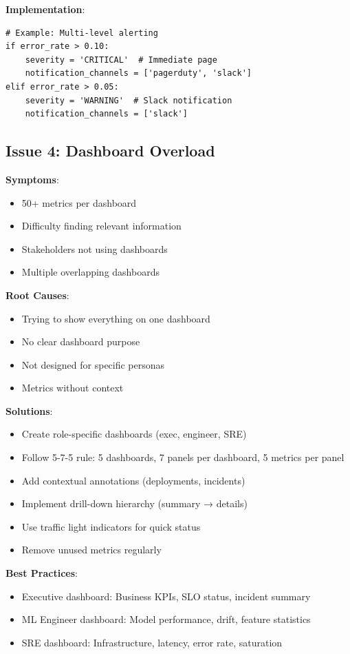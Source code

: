 \textbf{Implementation}:
\begin{lstlisting}[style=python]
# Example: Multi-level alerting
if error_rate > 0.10:
    severity = 'CRITICAL'  # Immediate page
    notification_channels = ['pagerduty', 'slack']
elif error_rate > 0.05:
    severity = 'WARNING'  # Slack notification
    notification_channels = ['slack']
\end{lstlisting}

\subsection{Issue 4: Dashboard Overload}

\textbf{Symptoms}:
\begin{itemize}
    \item 50+ metrics per dashboard
    \item Difficulty finding relevant information
    \item Stakeholders not using dashboards
    \item Multiple overlapping dashboards
\end{itemize}

\textbf{Root Causes}:
\begin{itemize}
    \item Trying to show everything on one dashboard
    \item No clear dashboard purpose
    \item Not designed for specific personas
    \item Metrics without context
\end{itemize}

\textbf{Solutions}:
\begin{itemize}
    \item Create role-specific dashboards (exec, engineer, SRE)
    \item Follow 5-7-5 rule: 5 dashboards, 7 panels per dashboard, 5 metrics per panel
    \item Add contextual annotations (deployments, incidents)
    \item Implement drill-down hierarchy (summary → details)
    \item Use traffic light indicators for quick status
    \item Remove unused metrics regularly
\end{itemize}

\textbf{Best Practices}:
\begin{itemize}
    \item Executive dashboard: Business KPIs, SLO status, incident summary
    \item ML Engineer dashboard: Model performance, drift, feature statistics
    \item SRE dashboard: Infrastructure, latency, error rate, saturation
\end{itemize}

